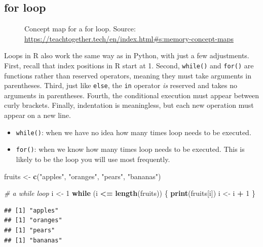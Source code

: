\documentclass[
]{book}
\newenvironment{Shaded}{\begin{snugshade}}{\end{snugshade}}
\newcommand{\CommentTok}[1]{\textcolor[rgb]{0.56,0.35,0.01}{\textit{#1}}}
\newcommand{\ControlFlowTok}[1]{\textcolor[rgb]{0.13,0.29,0.53}{\textbf{#1}}}
\newcommand{\DecValTok}[1]{\textcolor[rgb]{0.00,0.00,0.81}{#1}}
\newcommand{\FunctionTok}[1]{\textcolor[rgb]{0.13,0.29,0.53}{\textbf{#1}}}
\newcommand{\NormalTok}[1]{#1}
\newcommand{\OtherTok}[1]{\textcolor[rgb]{0.56,0.35,0.01}{#1}}
\newcommand{\SpecialCharTok}[1]{\textcolor[rgb]{0.81,0.36,0.00}{\textbf{#1}}}
\newcommand{\StringTok}[1]{\textcolor[rgb]{0.31,0.60,0.02}{#1}}
\providecommand{\tightlist}{%
  \setlength{\itemsep}{0pt}\setlength{\parskip}{0pt}}
\begin{document}
\subsection{for loop}\label{for-loop}

\begin{figure}
\centering

\caption{Concept map for a for loop. Source: \url{https://teachtogether.tech/en/index.html\#s:memory-concept-maps}}
\end{figure}

Loops in R also work the same way as in Python, with just a few adjustments. First, recall that index positions in R start at 1. Second, \texttt{while()} and \texttt{for()} are functions rather than reserved operators, meaning they must take arguments in parentheses. Third, just like \texttt{else}, the \texttt{in} operator \emph{is} reserved and takes no arguments in parentheses. Fourth, the conditional execution must appear between curly brackets. Finally, indentation is meaningless, but each new operation must appear on a new line.

\begin{itemize}
\tightlist
\item
  \texttt{while()}: when we have no idea how many times loop needs to be executed.
\item
  \texttt{for()}: when we know how many times loop needs to be executed. This is likely to be the loop you will use most frequently.
\end{itemize}

\begin{Shaded}
\begin{Highlighting}[]
\NormalTok{fruits }\OtherTok{\textless{}{-}} \FunctionTok{c}\NormalTok{(}\StringTok{"apples"}\NormalTok{, }\StringTok{"oranges"}\NormalTok{, }\StringTok{"pears"}\NormalTok{, }\StringTok{"bananas"}\NormalTok{)}

\CommentTok{\# a while loop}
\NormalTok{i }\OtherTok{\textless{}{-}} \DecValTok{1}
\ControlFlowTok{while}\NormalTok{ (i }\SpecialCharTok{\textless{}=} \FunctionTok{length}\NormalTok{(fruits)) \{}
  \FunctionTok{print}\NormalTok{(fruits[i])}
\NormalTok{  i }\OtherTok{\textless{}{-}}\NormalTok{ i }\SpecialCharTok{+} \DecValTok{1}
\NormalTok{\}}
\end{Highlighting}
\end{Shaded}

\begin{verbatim}
## [1] "apples"
## [1] "oranges"
## [1] "pears"
## [1] "bananas"
\end{verbatim}
\end{document}
